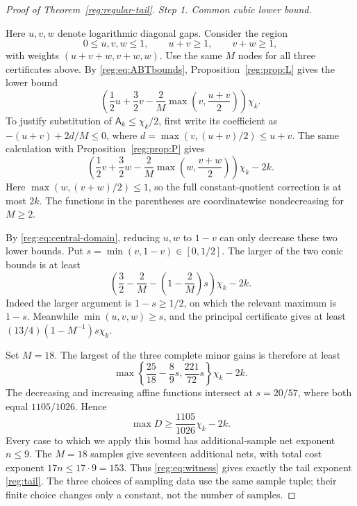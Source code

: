 \documentclass[11pt]{amsart}
\theoremstyle{definition}
\theoremstyle{remark}
\numberwithin{equation}{section}
\begin{document}
\begin{proof}[Proof of Theorem~\ref{reg:regular-tail}]
\par\medskip\noindent\textit{Step 1. Common cubic lower bound.}\par\nobreak\smallskip

Here $u,v,w$ denote logarithmic diagonal gaps. Consider the region
\begin{equation}\label{reg:eq:central-domain}
 0\le u,v,w\le1,\qquad u+v\ge1,\qquad v+w\ge1,
\end{equation}
with weights $(u+v+w,v+w,w)$. Use the same $M$ nodes for all three certificates above. By \eqref{reg:eq:ABTbounds}, Proposition~\ref{reg:prop:L} gives the lower bound
\begin{equation}\label{reg:eq:central-L}
 \left(\frac12u+\frac32v-\frac2M\max\left(v,\frac{u+v}{2}\right)\right)\chi_k.
\end{equation}
To justify substitution of $\mathsf A_k\le\chi_k/2$, first write its coefficient as $-(u+v)+2d/M\le0$, where $d=\max(v,(u+v)/2)\le u+v$. The same calculation with Proposition~\ref{reg:prop:P} gives
\begin{equation}\label{reg:eq:central-P}
 \left(\frac12v+\frac32w-\frac2M\max\left(w,\frac{v+w}{2}\right)\right)\chi_k-2k.
\end{equation}
Here $\max(w,(v+w)/2)\le1$, so the full constant-quotient correction is at most $2k$. The functions in the parentheses are coordinatewise nondecreasing for $M\ge2$.

By \eqref{reg:eq:central-domain}, reducing $u,w$ to $1-v$ can only decrease these two lower bounds. Put $s=\min(v,1-v)\in[0,1/2]$. The larger of the two conic bounds is at least
\begin{equation}\label{reg:eq:conic-max}
 \left(\frac32-\frac2M-\left(1-\frac2M\right)s\right)\chi_k-2k.
\end{equation}
Indeed the larger argument is $1-s\ge1/2$, on which the relevant maximum is $1-s$. Meanwhile $\min(u,v,w)\ge s$, and the principal certificate gives at least $(13/4)(1-M^{-1})s\chi_k$.

Set $M=18$. The largest of the three complete minor gains is therefore at least
\[
 \max\left\{\frac{25}{18}-\frac89s,\frac{221}{72}s\right\}\chi_k-2k.
\]
The decreasing and increasing affine functions intersect at $s=20/57$, where both equal $1105/1026$. Hence
\begin{equation}\label{reg:eq:central-complete}
 \max D\ge\frac{1105}{1026}\chi_k-2k.
\end{equation}
Every case to which we apply this bound has additional-sample net exponent $n\le9$. The $M=18$ samples give seventeen additional nets, with total cost exponent $17n\le17\cdot9=153$. Thus \eqref{reg:eq:witness} gives exactly the tail exponent \eqref{reg:tail}. The three choices of sampling data use the same sample tuple; their finite choice changes only a constant, not the number of samples.


\end{proof}
\end{document}
